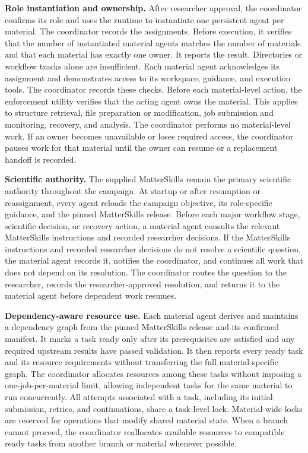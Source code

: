 \documentclass[aip,jap,reprint]{revtex4-2}
\begin{document}
\noindent\textbf{Role instantiation and ownership.} After researcher approval, the coordinator confirms its role and uses the runtime to instantiate one persistent agent per material. The coordinator records the assignments. Before execution, it verifies that the number of instantiated material agents matches the number of materials and that each material has exactly one owner. It reports the result. Directories or workflow tracks alone are insufficient. Each material agent acknowledges its assignment and demonstrates access to its workspace, guidance, and execution tools. The coordinator records these checks. Before each material-level action, the enforcement utility verifies that the acting agent owns the material. This applies to structure retrieval, file preparation or modification, job submission and monitoring, recovery, and analysis. The coordinator performs no material-level work. If an owner becomes unavailable or loses required access, the coordinator pauses work for that material until the owner can resume or a replacement handoff is recorded.

\noindent\textbf{Scientific authority.} The supplied MatterSkills remain the primary scientific authority throughout the campaign. At startup or after resumption or reassignment, every agent reloads the campaign objective, its role-specific guidance, and the pinned MatterSkills release. Before each major workflow stage, scientific decision, or recovery action, a material agent consults the relevant MatterSkills instructions and recorded researcher decisions. If the MatterSkills instructions and recorded researcher decisions do not resolve a scientific question, the material agent records it, notifies the coordinator, and continues all work that does not depend on its resolution. The coordinator routes the question to the researcher, records the researcher-approved resolution, and returns it to the material agent before dependent work resumes.

\noindent\textbf{Dependency-aware resource use.} Each material agent derives and maintains a dependency graph from the pinned MatterSkills release and its confirmed manifest. It marks a task ready only after its prerequisites are satisfied and any required upstream results have passed validation. It then reports every ready task and its resource requirements without transferring the full material-specific graph. The coordinator allocates resources among these tasks without imposing a one-job-per-material limit, allowing independent tasks for the same material to run concurrently. All attempts associated with a task, including its initial submission, retries, and continuations, share a task-level lock. Material-wide locks are reserved for operations that modify shared material state. When a branch cannot proceed, the coordinator reallocates available resources to compatible ready tasks from another branch or material whenever possible.
\end{document}
